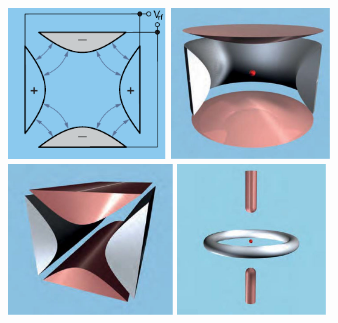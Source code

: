 \documentclass[
  journal=largetwo,
  year=2023,
]{cup-journal}
\begin{document}
\begin{figure}
  \centering
  \includegraphics[height=4cm]{figs/fig1/g96736.pdf}
  \includegraphics[height=4cm]{figs/fig1/p5_6.png}
  \includegraphics[height=4cm]{figs/fig1/p5_5.png}
  \includegraphics[height=4cm]{figs/fig1/p5_4.png}


\end{figure}
\end{document}
